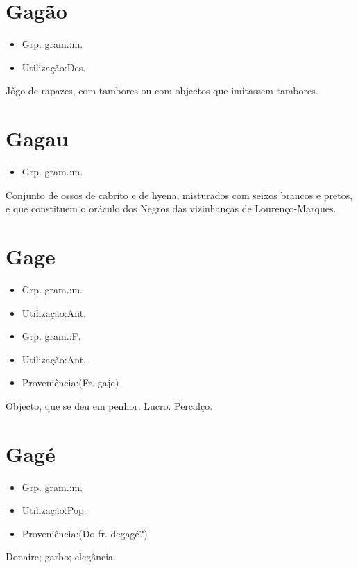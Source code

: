 \section{Gagão}
\begin{itemize}
\item {Grp. gram.:m.}
\end{itemize}
\begin{itemize}
\item {Utilização:Des.}
\end{itemize}
Jôgo de rapazes, com tambores ou com objectos que imitassem tambores.
\section{Gagau}
\begin{itemize}
\item {Grp. gram.:m.}
\end{itemize}
Conjunto de ossos de cabrito e de hyena, misturados com seixos brancos e pretos, e que constituem o oráculo dos Negros das vizinhanças de Lourenço-Marques.
\section{Gage}
\begin{itemize}
\item {Grp. gram.:m.}
\end{itemize}
\begin{itemize}
\item {Utilização:Ant.}
\end{itemize}
\begin{itemize}
\item {Grp. gram.:F.}
\end{itemize}
\begin{itemize}
\item {Utilização:Ant.}
\end{itemize}
\begin{itemize}
\item {Proveniência:(Fr. \textunderscore gaje\textunderscore )}
\end{itemize}
Objecto, que se deu em penhor.
Lucro.
Percalço.
\section{Gagé}
\begin{itemize}
\item {Grp. gram.:m.}
\end{itemize}
\begin{itemize}
\item {Utilização:Pop.}
\end{itemize}
\begin{itemize}
\item {Proveniência:(Do fr. \textunderscore degagé\textunderscore ?)}
\end{itemize}
Donaire; garbo; elegância.

